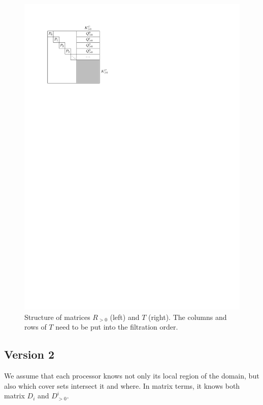 \documentclass{article}
\begin{document}
\begin{figure}
    \includegraphics{figs/matrix-T}
    \caption{Structure of matrices $R_{>0}$ (left) and $T$ (right).
             The columns and rows of $T$ need to be put into the filtration order.}
    \label{fig:matrices}
\end{figure}


\subsection{Version 2}

We assume that each processor knows not only its local region of the domain, but also
which cover sets intersect it and where. In matrix terms, it knows both matrix
$D_i$ and $D^i_{>0}$.
\end{document}
